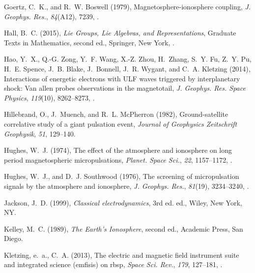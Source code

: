 \documentclass[draft,linenumbers]{agujournal}
\begin{document}
\begin{thebibliography}{62}
Goertz, C.~K., and R.~W. Boswell (1979), Magnetosphere-ionosphere coupling,
  \textit{J. Geophys. Res.}, \textit{84}(A12), 7239,
  .

Hall, B.~C. (2015), \textit{Lie Groups, Lie Algebras, and Representations},
  Graduate Texts in Mathematics, second ed., Springer, New York,
  .

Hao, Y.~X., Q.-G. Zong, Y.~F. Wang, X.-Z. Zhou, H.~Zhang, S.~Y. Fu, Z.~Y. Pu,
  H.~E. Spence, J.~B. Blake, J.~Bonnell, J.~R. Wygant, and C.~A. Kletzing
  (2014), Interactions of energetic electrons with {ULF} waves triggered by
  interplanetary shock: Van allen probes observations in the magnetotail,
  \textit{J. Geophys. Res. Space Physics}, \textit{119}(10), 8262--8273,
  .

Hillebrand, O., J.~Muench, and R.~L. McPherron (1982), Ground-satellite
  correlative study of a giant pulsation event, \textit{Journal of Geophysics
  Zeitschrift Geophysik}, \textit{51}, 129--140.

Hughes, W.~J. (1974), The effect of the atmosphere and ionosphere on long
  period magnetospheric micropulsations, \textit{Planet. Space Sci.},
  \textit{22}, 1157--1172, .

Hughes, W.~J., and D.~J. Southwood (1976), The screening of micropulsation
  signals by the atmosphere and ionosphere, \textit{J. Geophys. Res.},
  \textit{81}(19), 3234--3240, .

Jackson, J.~D. (1999), \textit{Classical electrodynamics}, 3rd ed. ed., Wiley,
  New York, {NY}.

Kelley, M.~C. (1989), \textit{The {Earth's} Ionosphere}, second ed., Academic
  Press, San Diego.

Kletzing, e.~a., C.~A. (2013), The electric and magnetic field instrument suite
  and integrated science (emfisis) on rbsp, \textit{Space Sci. Rev.},
  \textit{179}, 127--181, .


\end{thebibliography}
\end{document}
